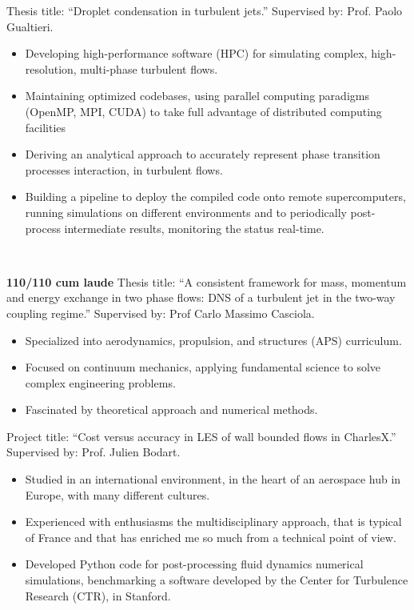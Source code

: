 	Thesis title: ``Droplet condensation in turbulent jets.'' Supervised by: Prof. Paolo Gualtieri. \\
	\smallskip
	\begin{itemize}
		\item Developing high-performance software (HPC) for simulating complex, high-resolution, multi-phase turbulent flows.
		\item Maintaining optimized codebases, using parallel computing paradigms (OpenMP, MPI, CUDA) to take full advantage of distributed computing facilities
		\item Deriving an analytical approach to accurately represent phase transition processes interaction, in turbulent flows.
		\item Building a pipeline to deploy the compiled code onto remote supercomputers, running simulations on different environments and to periodically post-process intermediate results, monitoring the status real-time.
	\end{itemize}
	\medskip
	\
	\medskip

	\textbf{110/110 cum laude} Thesis title: ``A consistent framework for mass, momentum and energy exchange in two phase flows: DNS of a turbulent jet in the two-way coupling regime.'' Supervised by: Prof Carlo Massimo Casciola. \\
	\smallskip
	\begin{itemize}
		\item Specialized into aerodynamics, propulsion, and structures (APS) curriculum.
		\item Focused on continuum mechanics, applying fundamental science to solve complex engineering problems.
		\item Fascinated by theoretical approach and numerical methods.
	\end{itemize}
	\medskip

	\divider

	Project title: ``Cost versus accuracy in LES of wall bounded flows in CharlesX.'' Supervised by: Prof. Julien Bodart. \\
	\medskip
	\begin{itemize}
		\item Studied in an international environment, in the heart of an aerospace hub in Europe, with many different cultures.
		\item Experienced with enthusiasms the multidisciplinary  approach, that is typical of France and that has enriched me so much from a technical point of view.
		\item Developed Python code for post-processing fluid dynamics numerical simulations, benchmarking a software developed by the Center for Turbulence Research (CTR), in Stanford.
	\end{itemize}
	\medskip

